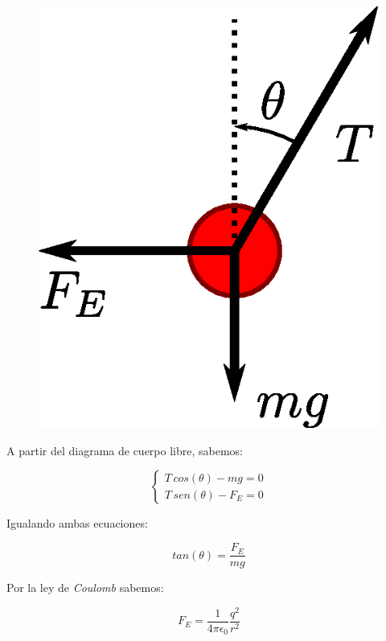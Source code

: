 \documentclass[letter,11pt]{article}
\begin{document}
\begin{enumerate}
\begin{figure}[!h]
\centering
\includegraphics[scale=0.36]{resources/a1.eps}
\end{figure}

A partir del diagrama de cuerpo libre, sabemos:

\begin{equation*}
    \begin{cases}
        T\,cos(\theta)-mg = 0 \\
        T\,sen(\theta)-F_E = 0
    \end{cases}
\end{equation*}

Igualando ambas ecuaciones:

\begin{equation*}
    tan(\theta) = \frac{F_E}{mg}
\end{equation*}

Por la ley de \emph{Coulomb} sabemos:

\begin{equation*}
    F_E = \frac{1}{4\pi\epsilon_0}\frac{q^2}{r^2}
\end{equation*}


\end{enumerate}
\end{document}

